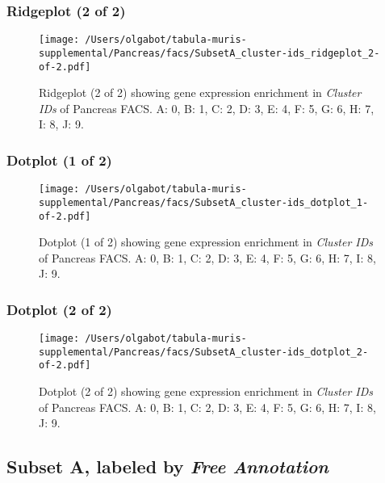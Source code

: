 \clearpage

\subsubsection{Ridgeplot (2 of 2)}
\begin{figure}[h]
\centering
\texttt{[image: /Users/olgabot/tabula-muris-supplemental/Pancreas/facs/SubsetA\_cluster-ids\_ridgeplot\_2-of-2.pdf]}

\caption{ Ridgeplot (2 of 2)  showing gene expression enrichment in \emph{Cluster IDs} of Pancreas FACS. A: 0, B: 1, C: 2, D: 3, E: 4, F: 5, G: 6, H: 7, I: 8, J: 9.}
\end{figure}


\clearpage

\subsubsection{Dotplot (1 of 2)}
\begin{figure}[h]
\centering
\texttt{[image: /Users/olgabot/tabula-muris-supplemental/Pancreas/facs/SubsetA\_cluster-ids\_dotplot\_1-of-2.pdf]}

\caption{ Dotplot (1 of 2)  showing gene expression enrichment in \emph{Cluster IDs} of Pancreas FACS. A: 0, B: 1, C: 2, D: 3, E: 4, F: 5, G: 6, H: 7, I: 8, J: 9.}
\end{figure}


\clearpage

\subsubsection{Dotplot (2 of 2)}
\begin{figure}[h]
\centering
\texttt{[image: /Users/olgabot/tabula-muris-supplemental/Pancreas/facs/SubsetA\_cluster-ids\_dotplot\_2-of-2.pdf]}

\caption{ Dotplot (2 of 2)  showing gene expression enrichment in \emph{Cluster IDs} of Pancreas FACS. A: 0, B: 1, C: 2, D: 3, E: 4, F: 5, G: 6, H: 7, I: 8, J: 9.}
\end{figure}


\clearpage

\subsection{Subset A, labeled by \emph{Free Annotation}}
